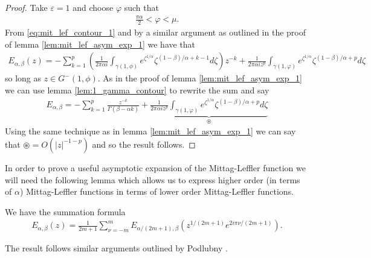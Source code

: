 \begin{proof}
    Take $ \varepsilon = 1 $ and choose $ \varphi $ such that
    \begin{align}
        \frac{\pi \alpha}{2} < \varphi < \mu.
    \end{align}
    From \eqref{eq:mit_lef_contour_1} and by a similar argument as outlined in the proof of lemma \ref{lem:mit_lef_asym_exp_1} we have that
    \begin{align}
        E_{\alpha, \beta}(z) = -\sum_{k=1}^{p} \left( \frac{1}{2\pi\alpha i} \int_{\gamma(1, \phi)} e^{\zeta^{1/\alpha}} \zeta^{(1-\beta)/\alpha + k - 1} d\zeta\right) z^{-k} + \frac{1}{2\pi \alpha i z^p} \int_{\gamma(1, \varphi)} e^{\zeta^{1/\alpha}} \zeta^{(1-\beta)/\alpha + p} d\zeta
    \end{align}
    so long as $ z \in G^-(1, \phi) $. As in the proof of lemma \ref{lem:mit_lef_asym_exp_1} we can use lemma \ref{lem:1_gamma_contour} to rewrite the sum and say
    \begin{align}
        E_{\alpha,\beta} = - \sum_{k=1}^p \frac{z^{-k}}{\Gamma(\beta - \alpha k)} + \underbrace{\frac{1}{2\pi \alpha i z^p} \int_{\gamma(1, \varphi)} e^{\zeta^{1/\alpha}} \zeta^{(1-\beta)/\alpha + p} d\zeta}_{\circledast}
    \end{align}
    Using the same technique as in lemma \ref{lem:mit_lef_asym_exp_1} we can say that $ \circledast = O(|z|^{-1-p}) $ and so the result follows.
\end{proof}
In order to prove a useful asymptotic expansion of the Mittag-Leffler function we will need the following lemma which allows us to express higher order (in terms of $ \alpha $) Mittag-Leffler functions in terms of lower order Mittag-Leffler functions. 
\begin{lemma}
    \label{lem:mit_lef_summation}
    We have the summation formula
    \begin{align}
        E_{\alpha, \beta}(z) = \frac{1}{2m+1} \sum_{\nu=-m}^{m} E_{\alpha / (2m+1), \beta}\left( z^{1/(2m+1)} e^{2i\pi\nu/(2m+1)}\right).
    \end{align}
\end{lemma}
The result follows similar arguments outlined by Podlubny \cite{Podlubny1999}.

